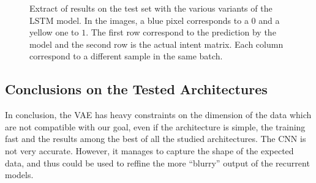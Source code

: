 \begin{figure}
    \hspace{2em}
    \hspace{2em}
    \caption{Extract of results on the test set with the various variants of the LSTM model. In the images, a blue pixel corresponds to a $0$ and a yellow one to $1$. The first row correspond to the prediction by the model and the second row is the actual intent matrix. Each column correspond to a different sample in the same batch.}
\end{figure}

\subsection{Conclusions on the Tested Architectures}
In conclusion, the VAE has heavy constraints on the dimension of the data which are not compatible with our goal, even if the architecture is simple, the training fast and the results among the best of all the studied architectures.
The CNN is not very accurate. However, it manages to capture the shape of the expected data, and thus could be used to reffine the more ``blurry'' output of the recurrent models.

